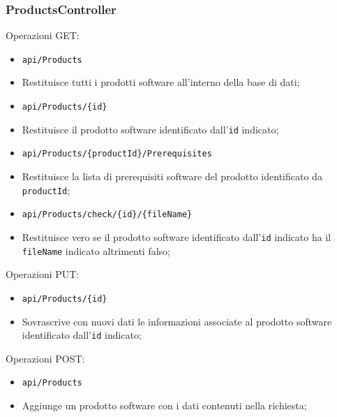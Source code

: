 \documentclass[../RelazioneFinale.tex]{subfiles}
\begin{document}
			\subsubsection{ProductsController}
			\begin{description}
			
				\item Operazioni GET:
				\begin{itemize}
				
					\item \verb|api/Products| 
					\item[] Restituisce tutti i prodotti software all'interno della base di dati;
					
					\item \verb|api/Products/{id}| 
					\item[] Restituisce il prodotto software identificato dall'\verb|id| indicato;
					
					\item \verb|api/Products/{productId}/Prerequisites|
					\item[] Restituisce la lista di prerequisiti software del prodotto identificato da \verb|productId|;
					
					\item \verb|api/Products/check/{id}/{fileName}|
					\item[] Restituisce vero se il prodotto software identificato dall'\verb|id| indicato ha il \verb|fileName| indicato altrimenti falso;
					
				\end{itemize}			
				
				\item Operazioni PUT:
				\begin{itemize}
				
					\item \verb|api/Products/{id}|
					\item[] Sovrascrive con nuovi dati le informazioni associate al prodotto software identificato dall'\verb|id| indicato;
					
				\end{itemize}								
				
				\item Operazioni POST:
				\begin{itemize}
					\item \verb|api/Products|
					\item[] Aggiunge un prodotto software con i dati contenuti nella richiesta;
					

\end{itemize}
\end{description}
\end{document}
